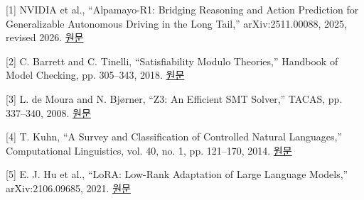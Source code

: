 \documentclass[11pt,a4paper]{article}
\begin{document}
[1] NVIDIA et al., “Alpamayo-R1: Bridging Reasoning and Action Prediction for Generalizable Autonomous Driving in the Long Tail,” arXiv:2511.00088, 2025, revised 2026. \href{\detokenize{https://arxiv.org/abs/2511.00088}}{원문}\par

[2] C. Barrett and C. Tinelli, “Satisfiability Modulo Theories,” Handbook of Model Checking, pp. 305–343, 2018. \href{\detokenize{https://theory.stanford.edu/~barrett/pubs/BT18.pdf}}{원문}\par

[3] L. de Moura and N. Bjørner, “Z3: An Efficient SMT Solver,” TACAS, pp. 337–340, 2008. \href{\detokenize{https://doi.org/10.1007/978-3-540-78800-3_24}}{원문}\par

[4] T. Kuhn, “A Survey and Classification of Controlled Natural Languages,” Computational Linguistics, vol. 40, no. 1, pp. 121–170, 2014. \href{\detokenize{https://aclanthology.org/J14-1005/}}{원문}\par

[5] E. J. Hu et al., “LoRA: Low-Rank Adaptation of Large Language Models,” arXiv:2106.09685, 2021. \href{\detokenize{https://arxiv.org/abs/2106.09685}}{원문}\par
\end{document}

